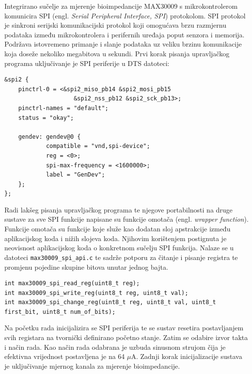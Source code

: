 \documentclass[../diplomski_rad.tex]{subfiles}
\begin{document}
Integrirano sučelje za mjerenje bioimpedancije MAX30009 s mikrokontrolerom komunicira SPI 
(engl. \textit{Serial Peripheral Interface, SPI}) protokolom. 
SPI protokol je sinkroni serijski komunikacijski protokol koji omogućava brzu razmjernu podataka između 
mikrokontrolera i perifernih uređaja poput senzora i memorija. 
Podržava istovremeno primanje i slanje podataka uz veliku 
brzinu komunikacije koja doseže nekoliko megabitova u sekundi.
Prvi korak pisanja upravljačkog programa uključivanje je SPI periferije u DTS datoteci:  
\begin{lstlisting}[label={lst:dts_max30009},style=CStyle,caption={Definiranje MAX30009 senzora u DTS-u},captionpos=b]
&spi2 {
    pinctrl-0 = <&spi2_miso_pb14 &spi2_mosi_pb15 
                    &spi2_nss_pb12 &spi2_sck_pb13>;
    pinctrl-names = "default";
    status = "okay";

    gendev: gendev@0 {
            compatible = "vnd,spi-device";
            reg = <0>;
            spi-max-frequency = <1600000>;
            label = "GenDev";
    };	
};
\end{lstlisting} 

Radi lakšeg pisanja upravljačkog programa te njegove portabilnosti na druge sustave za sve SPI funkcije 
napisane su funkcije omotača (engl. \textit{wrapper function}). 
Funkcije omotača su funkcije koje služe kao dodatan sloj apstrakcije između aplikacijskog koda i nižih slojeva koda. 
Njihovim korištenjem postignuta je neovisnost aplikacijskog koda o konkretnom sučelju 
SPI funkcija. 
Nalaze se u datoteci \texttt{max30009\_spi\_api.c} te sadrže 
potporu za čitanje i pisanje registra te promjenu pojedine skupine bitova unutar jednog bajta. 

\begin{lstlisting}[label={lst:api_api},style=CStyle,caption={Funkcije omotača SPI komunikacije},captionpos=b]
int max30009_spi_read_reg(uint8_t reg);
int max30009_spi_write_reg(uint8_t reg, uint8_t val);
int max30009_spi_change_reg(uint8_t reg, uint8_t val, uint8_t first_bit, uint8_t num_of_bits);
\end{lstlisting} 

Na početku rada inicijalizira se SPI periferija te se sustav resetira postavljanjem svih registara na tvornički definirano početno stanje. 
Zatim se odabire izvor takta i način rada. Kao način rada odabrana je uzbuda sinusnom strujom 
čija je efektivna vrijednost postavljena je na 64  $\mu$A. 
Zadnji korak inicijalizacije sustava je uključivanje mjernog kanala za mjerenje bioimpedancije.
\end{document}
